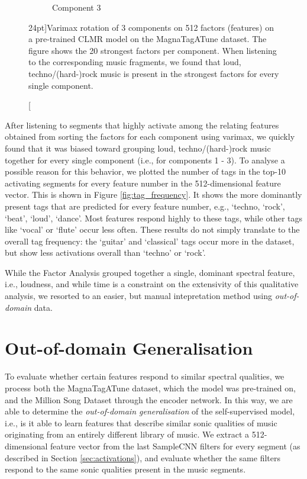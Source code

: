 \begin{figure}[h]
\begin{subfigure}[b]{0.3\textwidth}
        \caption{Component 3}
    \end{subfigure}
    \caption[][24pt]{Varimax rotation of 3 components on 512 factors (features) on a pre-trained CLMR model on the MagnaTagATune dataset. The figure shows the 20 strongest factors per component. When listening to the corresponding music fragments, we found that loud, techno/(hard-)rock music is present in the strongest factors for every single component.}
    \label{fig:varimax_rotation}
\end{figure}

After listening to segments that highly activate among the relating features obtained from sorting the factors for each component using varimax, we quickly found that it was biased toward grouping loud, techno/(hard-)rock music together for every single component (i.e., for components 1 - 3). To analyse a possible reason for this behavior, we plotted the number of tags in the top-10 activating segments for every feature number in the 512-dimensional feature vector. This is shown in Figure \ref{fig:tag_frequency}. It shows the more dominantly present tags that are predicted for every feature number, e.g., `techno, `rock', `beat', `loud', `dance'. Most features respond highly to these tags, while other tags like `vocal' or `flute' occur less often. These results do not simply translate to the overall tag frequency: the `guitar' and `classical' tags occur more in the dataset, but show less activations overall than `techno' or `rock'.

While the Factor Analysis grouped together a single, dominant spectral feature, i.e., loudness, and while time is a constraint on the extensivity of this qualitative analysis, we resorted to an easier, but manual intepretation method using \textit{out-of-domain} data.


\section{Out-of-domain Generalisation}\label{sec:manual_interpretations}
To evaluate whether certain features respond to similar spectral qualities, we process both the MagnaTagATune dataset, which the model was pre-trained on, and the Million Song Dataset through the encoder network. In this way, we are able to determine the \textit{out-of-domain generalisation} of the self-supervised model, i.e., is it able to learn features that describe similar sonic qualities of music originating from an entirely different library of music. We extract a 512-dimensional feature vector from the last SampleCNN filters for every segment (as described in Section \ref{sec:activations}), and evaluate whether the same filters respond to the same sonic qualities present in the music segments.

